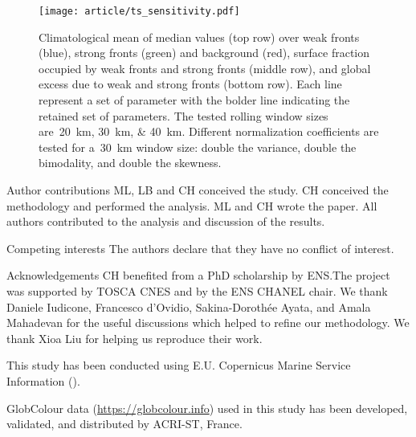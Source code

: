 
\begin{figure}
  \centering
  \texttt{[image: article/ts\_sensitivity.pdf]}
  \caption[Sensitivity of the seasonal impact of fronts on  parameters]{%
    Climatological mean of  median values (top row) over weak fronts (blue), strong fronts (green) and background (red), surface fraction occupied by weak fronts and strong fronts (middle row), and global  excess due to weak and strong fronts (bottom row).
    Each line represent a set of parameter with the bolder line indicating the retained set of parameters.
    The tested rolling window sizes are~\qtylist{20;30;40}{\km}.
    Different normalization coefficients are tested for a~\qty{30}{\km} window size: double the variance, double the bimodality, and double the skewness.
  }%
  \label{fig:ts-sensitivity}
\end{figure}


\begin{articleSubBlock}{Author contributions}
  ML, LB and CH conceived the study. CH conceived the methodology and performed the analysis. ML and CH wrote the paper. All authors contributed to the analysis and discussion of the results.
\end{articleSubBlock}


\begin{articleSubBlock}{Competing interests}
  The authors declare that they have no conflict of interest.
\end{articleSubBlock}

\begin{articleSubBlock}{Acknowledgements}
  CH benefited from a PhD scholarship by ENS.\@ The project was supported by TOSCA CNES and by the ENS CHANEL chair.
  We thank Daniele Iudicone, Francesco d'Ovidio, Sakina-Dorothée Ayata, and Amala Mahadevan for the useful discussions which helped to refine our methodology. We thank Xioa Liu for helping us reproduce their work.

  This study has been conducted using E.U. Copernicus Marine Service Information (\cite[datasets used:][]{article_chl, article_sst}).

  GlobColour data (\url{https://globcolour.info}) used in this study has been developed, validated, and distributed by ACRI-ST, France.
\end{articleSubBlock}

% 
